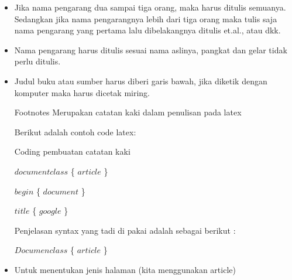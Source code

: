 \begin{itemize}
\vspace{\baselineskip}
	\item Jika nama pengarang dua sampai tiga orang, maka harus ditulis semuanya. Sedangkan jika nama pengarangnya lebih dari tiga orang maka tulis saja nama pengarang yang pertama lalu dibelakangnya ditulis et.al., atau dkk.\par

\vspace{\baselineskip}
	\item Nama pengarang harus ditulis sesuai nama aslinya, pangkat dan gelar tidak perlu ditulis.\par

\vspace{\baselineskip}
	\item Judul buku atau sumber harus diberi garis bawah, jika diketik dengan komputer maka harus dicetak miring.\par

\vspace{\baselineskip}
Footnotes Merupakan catatan kaki dalam penulisan pada latex \par

\vspace{\baselineskip}
Berikut adalah contoh code latex:\par

\vspace{\baselineskip}
Coding pembuatan catatan kaki\par

\vspace{\baselineskip}
$documentclass$ \{ $article$ \} \par

$begin$ \{ $document$ \} \par

$title$ \{ $google$ \} \par

\vspace{\baselineskip}
Penjelasan syntax yang tadi di pakai adalah sebagai berikut :\par

\vspace{\baselineskip}
$Documenclass$ \{ $article$ \} \par

\vspace{\baselineskip}
	\item Untuk menentukan jenis halaman (kita menggunakan article)\par


\end{itemize}
